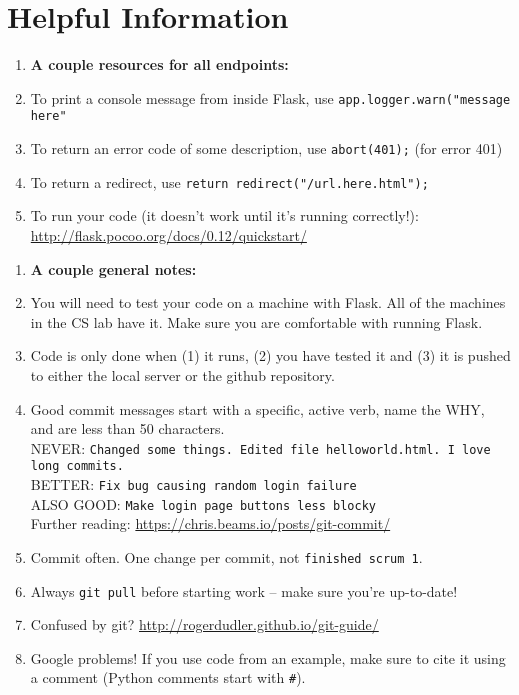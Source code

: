 \documentclass[12pt,letterpaper]{article}
\begin{document}
\section*{Helpful Information}
\begin{enumerate}
	\item[] \textbf{A couple resources for all endpoints:}\\
	\item To print a console message from inside Flask, use
		\texttt{app.logger.warn("message here"}\\
	\item To return an error code of some description, use
		\texttt{abort(401);} (for error 401)\\
	\item To return a redirect, use 
		\texttt{return redirect("/url.here.html");}\\
	\item To run your code (it doesn't work until it's running correctly!):
		\url{http://flask.pocoo.org/docs/0.12/quickstart/}\\
\end{enumerate}
\par
\begin{enumerate}
	\item[] \textbf{A couple general notes:}\\
	\item You will need to test your code on a machine with Flask. All of the
		machines in the CS lab have it. Make sure you are comfortable with running Flask.\\
	\item Code is only done when (1) it runs, (2) you have tested it and (3) it is pushed
		to either the local server or the github repository.\\
	\item Good commit messages start with a specific, active verb, name the WHY, and are
		less than 50 characters.\\
	 NEVER: \texttt{Changed some things. Edited file helloworld.html. I love long commits.}\\
	 BETTER: \texttt{Fix bug causing random login failure}\\
	 ALSO GOOD: \texttt{Make login page buttons less blocky}\\
	 Further reading: \url{https://chris.beams.io/posts/git-commit/}\\
	\item Commit often. One change per commit, not \texttt{finished scrum 1}.\\
	\item Always \texttt{git pull} before starting work -- make sure you're up-to-date!\\
	\item Confused by git? \url{http://rogerdudler.github.io/git-guide/}\\
	\item Google problems! If you use code from an example, make sure to cite it using
		a comment (Python comments start with \texttt{\#}).\\
\end{enumerate}
\end{document}
